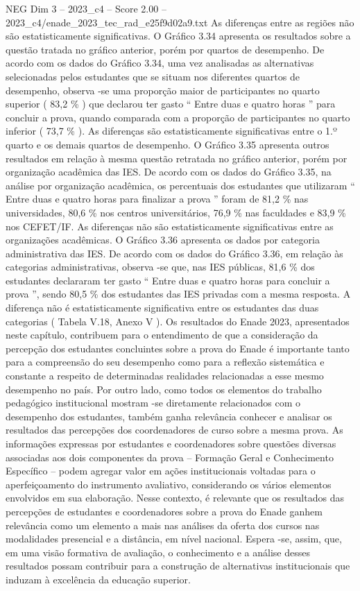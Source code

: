 \begin{textsample}{NEG Dim 3 – 2023\_c4 – Score 2.00 – 2023\_c4/enade\_2023\_tec\_rad\_e25f9d02a9.txt}
As diferenças entre as regiões não são estatisticamente significativas.
O Gráfico 3.34 apresenta os resultados sobre a questão tratada no gráfico anterior, porém por quartos de desempenho.
De acordo com os dados do Gráfico 3.34, uma vez analisadas as alternativas selecionadas pelos estudantes que se situam nos diferentes quartos de desempenho, observa -se uma proporção maior de participantes no quarto superior ( 83,2 \% ) que declarou ter gasto “ Entre duas e quatro horas ” para concluir a prova, quando comparada com a proporção de participantes no quarto inferior ( 73,7 \% ).
As diferenças são estatisticamente significativas entre o 1.º quarto e os demais quartos de desempenho.
O Gráfico 3.35 apresenta outros resultados em relação à mesma questão retratada no gráfico anterior, porém por organização acadêmica das IES.
De acordo com os dados do Gráfico 3.35, na análise por organização acadêmica, os percentuais dos estudantes que utilizaram “ Entre duas e quatro horas para finalizar a prova ” foram de 81,2 \% nas universidades, 80,6 \% nos centros universitários, 76,9 \% nas faculdades e 83,9 \% nos CEFET/IF.
As diferenças não são estatisticamente significativas entre as organizações acadêmicas.
O Gráfico 3.36 apresenta os dados por categoria administrativa das IES.
De acordo com os dados do Gráfico 3.36, em relação às categorias administrativas, observa -se que, nas IES públicas, 81,6 \% dos estudantes declararam ter gasto “ Entre duas e quatro horas para concluir a prova ”, sendo 80,5 \% dos estudantes das IES privadas com a mesma resposta.
A diferença não é estatisticamente significativa entre os estudantes das duas categorias ( Tabela V.18, Anexo V ).
Os resultados do Enade 2023, apresentados neste capítulo, contribuem para o entendimento de que a consideração da percepção dos estudantes concluintes sobre a prova do Enade é importante tanto para a compreensão do seu desempenho como para a reflexão sistemática e constante a respeito de determinadas realidades relacionadas a esse mesmo desempenho no país.
Por outro lado, como todos os elementos do trabalho pedagógico institucional mostram -se diretamente relacionados com o desempenho dos estudantes, também ganha relevância conhecer e analisar os resultados das percepções dos coordenadores de curso sobre a mesma prova.
As informações expressas por estudantes e coordenadores sobre questões diversas associadas aos dois componentes da prova – Formação Geral e Conhecimento Específico – podem agregar valor em ações institucionais voltadas para o aperfeiçoamento do instrumento avaliativo, considerando os vários elementos envolvidos em sua elaboração.
Nesse contexto, é relevante que os resultados das percepções de estudantes e coordenadores sobre a prova do Enade ganhem relevância como um elemento a mais nas análises da oferta dos cursos nas modalidades presencial e a distância, em nível nacional.
Espera -se, assim, que, em uma visão formativa de avaliação, o conhecimento e a análise desses resultados possam contribuir para a construção de alternativas institucionais que induzam à excelência da educação superior.

\end{textsample}
